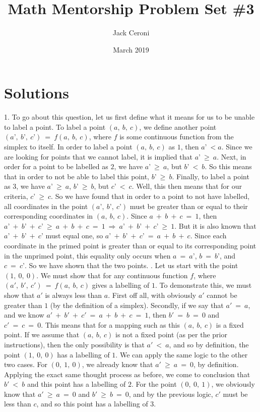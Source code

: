 \documentclass{article}
\title{Math Mentorship Problem Set \#3}
\author{Jack Ceroni}
\date{March 2019}
\begin{document}
\maketitle
\newpage
\section{Solutions}
1. To go about this question, let us first define what it means for us to be unable to label a point. To label a point $(a, \ b, \ c)$, we define another point $(a’, \ b’, \ c’) \ = \ f(a, \ b, \ c)$, where $f$ is some continuous function from the simplex to itself. In order to label a point $(a, \ b, \ c)$ as $1$, then $a’ \ < a$. Since we are looking for points that we cannot label, it is implied that $a’ \ \geq \ a$. Next, in order for a point to be labelled as $2$, we have $a’ \ \geq \ a$, but $b’ \ < \ b$. So this means that in order to not be able to label this point, $b’ \ \geq \ b$. Finally, to label a point as $3$, we have $a’ \ \geq \ a$, $b’ \ \geq \ b$, but $c’ \ < \ c$. Well, this then means that for our criteria, $c’ \ \geq \ c$. So we have found that in order to a point to not have labelled, all coordinates in the point $(a’, \ b’, \ c’)$ must be greater than or equal to their corresponding coordinates in $(a, \ b, \ c)$. Since $a \ + \ b \ + \ c \ = \ 1$, then $a’ \ + \ b’ \ + \ c’ \ \geq \ a \ + \ b \ + \ c \ = \ 1 \ \Rightarrow \ a’ \ + \ b’ \ + \ c’ \ \geq \ 1$. But it is also known that $a’ \ + \ b’ \ + \ c’$ must equal one, so $a’ \ + \ b’ \ + \ c’ \ = \ a \ + \ b \ + \ c$. Since each coordinate in the primed point is greater than or equal to its corresponding point in the unprimed point, this equality only occurs when $a \ = \ a’$, $b \ = \ b’$, and $c \ = \ c’$. So we have shown that the two points.
\newline{}. Let us start with the point $(1, \ 0, \ 0)$. We must show that for any continuous function $f$, where $(a', \ b', \ c') \ = \ f(a, \ b, \ c)$ gives a labelling of $1$. To demonstrate this, we must show that $a'$ is always less than $a$. First off all, with obviously $a'$ cannot be greater than $1$ (by the definition of a simplex). Secondly, if we say that $a' \ = \ a$, and we know $a' \ + \ b' \ + \ c' \ = \ a \ + \ b \ + \ c \ = \ 1$, then $b' \ = \ b \ = \ 0$ and $c' \ = \ c \ = \ 0$. This means that for a mapping such as this $(a, \ b, \ c)$ is a fixed point. If we assume that $(a, \ b, \ c)$ is not a fixed point (as per the prior instructions), then the only possibility is that $a' \ < \ a$, and so by definition, the point $(1, \ 0, \ 0)$ has a labelling of $1$. We can apply the same logic to the other two cases. For $(0, \ 1, \ 0)$, we already know that $a' \ \geq \ a \ = \ 0$, by definition. Applying the exact same thought process as before, we come to conclusion that $b' \ < \ b$ and this point has a labelling of $2$. For the point $(0, \ 0, \ 1)$, we obviously know that $a' \ \geq \ a \ = \ 0$ and $b' \ \geq \ b \ = \ 0$, and by the previous logic, $c'$ must be less than $c$, and so this point has a labelling of $3$.
\end{document}
